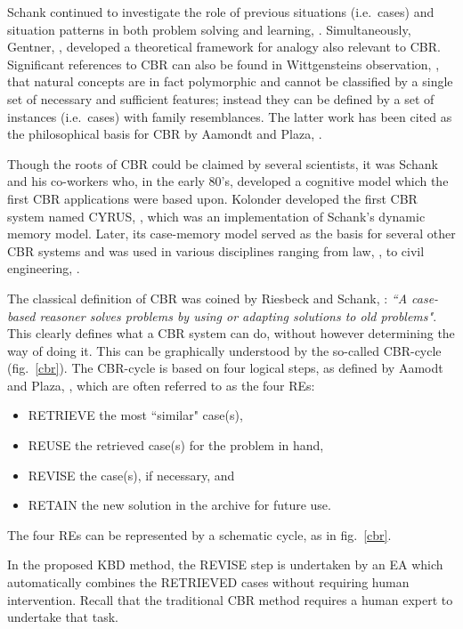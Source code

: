 Schank continued to investigate the role of previous situations (i.e.\ cases) 
and situation patterns in both problem solving and learning, \cite{Schank_1982}.  
Simultaneously, Gentner, \cite{genter_1983}, developed a  
theoretical framework for analogy also relevant to CBR. Significant references to CBR can also be found in 
Wittgensteins observation, \cite{wittgestein_1953}, that natural concepts are in fact 
polymorphic and cannot be classified by a single set of necessary and sufficient 
features; instead they can be defined by a set of instances (i.e.\ cases) with family 
resemblances. The latter work has been cited as the philosophical basis for CBR by Aamondt and Plaza, \cite{aamond_plaza_1994}.

Though the roots of CBR could be claimed by several scientists, it was Schank and his co-workers who, in the early 80's, developed a cognitive model which the first CBR applications were based upon. Kolonder developed the first CBR system named CYRUS, \cite{kolodner_1983a,kolodner_1983b}, which was an implementation of Schank's dynamic memory model. Later, its case-memory model served as the basis for several other CBR systems and was used in various disciplines ranging from law, \cite{ashley_1988,rissland_skalak_1989}, to civil engineering, \cite{whatson_abdullah_1994,moore_1994}.

\label {CBR}  The classical definition of CBR was coined by Riesbeck and Schank, \cite{riesbeck_1989}: \textit{``A case-based reasoner solves problems by using or adapting solutions to old problems"}. This clearly defines what a CBR system can do, without however determining the way of doing it. This can be graphically understood by the so-called CBR-cycle (fig.\ \ref{cbr}).  The CBR-cycle is based on four logical steps, as defined by Aamodt and Plaza, \cite{aamond_plaza_1994}, which are often referred to as the four REs: 

\begin{itemize}
  \item RETRIEVE the most ``similar" case(s),
  \item REUSE the retrieved case(s) for the problem in hand,
  \item REVISE the case(s), if necessary, and
  \item RETAIN the new solution in the archive for future use.
\end{itemize}
The four REs can be represented by a schematic cycle, as in fig.\ \ref{cbr}.

In the proposed KBD method, the REVISE step is undertaken by an EA which automatically combines the RETRIEVED cases without requiring human intervention. Recall that the traditional CBR method requires a human expert to undertake that task.  

